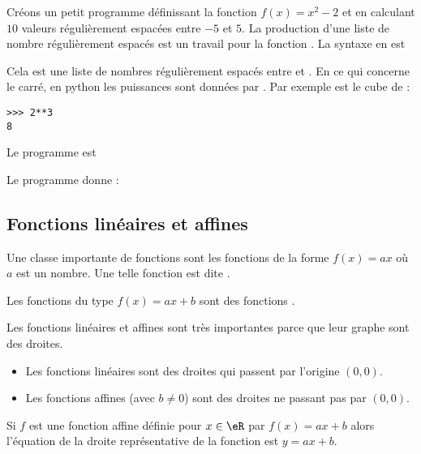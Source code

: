 \begin{example}
    Créons un petit programme définissant la fonction \( f(x)=x^2-2\) et en calculant \( 10\) valeurs régulièrement espacées entre \( -5\) et \( 5\). La production d'une liste de nombre régulièrement espacés est un travail pour la fonction . La syntaxe en est 
\begin{quote}
\end{quote}
Cela est une liste de  nombres régulièrement espacés entre  et . En ce qui concerne le carré, en python les puissances sont données par \info{**}. Par exemple  est le cube de  :
\begin{verbatim}
>>> 2**3
8
\end{verbatim}
Le programme est



Le programme donne :


    
\end{example}

\subsection{Fonctions linéaires et affines}

\begin{definition}
    Une classe importante de fonctions sont les fonctions de la forme \( f(x)=ax\) où \( a\) est un nombre. Une telle fonction est dite . 

    Les fonctions du type \( f(x)=ax+b\) sont des fonctions . 
\end{definition}


\begin{Aretenir}
    Les fonctions linéaires et affines sont très importantes parce que leur graphe sont des droites. 
    \begin{itemize}
        \item 
    Les fonctions linéaires sont des droites qui passent par l'origine \( (0,0)\).
    \item
    Les fonctions affines (avec \( b\neq 0\)) sont des droites ne passant pas par \( (0,0)\).
    \end{itemize}
\end{Aretenir}
Si $f$ est une fonction affine définie pour $x\in\eR$ par $f(x)=ax+b$ alors l'équation de la droite représentative de la fonction est $y=ax+b$. 

